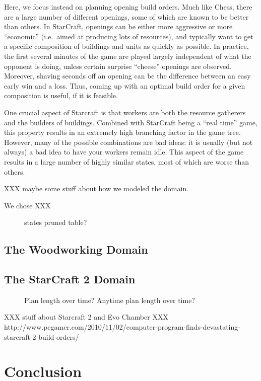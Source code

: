 \documentclass[letterpaper]{article}
\theoremstyle{plain} \newtheorem{theorem}{Theorem} \newtheorem{proposition}{Proposition} \newtheorem{lemma}{Lemma}
\theoremstyle{definition} \newtheorem{definition}{Definition} \newtheorem{conjecture}{Conjecture} \newtheorem*{example}{Example}
\theoremstyle{remark} \newtheorem*{remark}{Remark} \newtheorem*{note}{Note} \newtheorem{case}{Case}
\begin{document}
Here, we focus instead on planning opening build orders. Much like
Chess, there are a large number of different openings, some of which
are known to be better than others. In StarCraft, openings can be
either more aggressive or more ``economic'' (i.e.\ aimed at producing
lots of resources), and typically want to get a specific composition
of buildings and units as quickly as possible.  In practice, the
first several minutes of the game are played largely independent
of what the opponent is doing, unless certain surprise ``cheese''
openings are observed. Moreover, shaving seconds off an opening can
be the difference between an easy early win and a loss. Thus, coming
up with an optimal build order for a given composition is useful,
if it is feasible.

One crucial aspect of Starcraft is that workers are both the resource gatherers
and the builders of buildings. Combined with StarCraft being a ``real time'' game, 
this property results in an extremely high branching factor in the game tree. However,
many of the possible combinations are bad ideas: it is usually (but not always) a bad idea
to have your workers remain idle. This aspect of the game results in a large number of highly similar
states, most of which are worse than others.

XXX maybe some stuff about how we modeled the domain.

We chose XXX

\begin{figure}
  \caption{states pruned table?}
\end{figure}
\subsection{The Woodworking Domain}
\subsection{The StarCraft 2 Domain}
\begin{figure}
  \caption{Plan length over time? Anytime plan length over time?}
\end{figure}

XXX stuff about Starcraft 2 and Evo Chamber
XXX http://www.pcgamer.com/2010/11/02/computer-program-finds-devastating-starcraft-2-build-orders/

\section{Conclusion}



\end{document}
